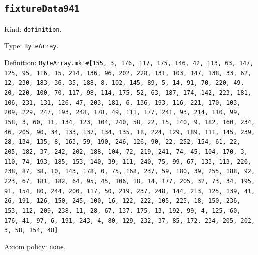 \documentclass[11pt]{article}
\begin{document}
\subsection*{\texttt{fixtureData941}}
\noindent Kind: \texttt{definition}.\par
\noindent Type: \texttt{ByteArray}.\par
\noindent Definition: \texttt{ByteArray.mk \#[155, 3, 176, 117, 175, 146, 42, 113, 63, 147, 125, 95, 116, 15, 214, 136, 96, 202, 228, 131, 103, 147, 138, 33, 62, 12, 230, 183, 36, 35, 188, 8, 102, 145, 89, 5, 14, 91, 70, 220, 49, 20, 220, 100, 70, 117, 98, 114, 175, 52, 63, 187, 174, 142, 223, 181, 106, 231, 131, 126, 47, 203, 181, 6, 136, 193, 116, 221, 170, 103, 209, 229, 247, 193, 248, 178, 49, 111, 177, 241, 93, 214, 110, 99, 158, 3, 60, 11, 134, 123, 104, 240, 58, 22, 15, 140, 9, 182, 160, 234, 46, 205, 90, 34, 133, 137, 134, 135, 18, 224, 129, 189, 111, 145, 239, 28, 134, 135, 8, 163, 59, 190, 246, 126, 90, 22, 252, 154, 61, 22, 205, 182, 37, 242, 202, 188, 104, 72, 219, 241, 74, 45, 104, 170, 3, 110, 74, 193, 185, 153, 140, 39, 111, 240, 75, 99, 67, 133, 113, 220, 238, 87, 38, 10, 143, 178, 0, 75, 168, 237, 59, 180, 39, 255, 188, 92, 223, 67, 181, 182, 64, 95, 45, 106, 18, 14, 177, 205, 32, 73, 34, 195, 91, 154, 80, 244, 200, 117, 50, 219, 237, 248, 144, 213, 125, 139, 41, 26, 191, 126, 150, 245, 100, 16, 122, 222, 105, 225, 18, 150, 236, 153, 112, 209, 238, 11, 28, 67, 137, 175, 13, 192, 99, 4, 125, 60, 176, 41, 97, 6, 191, 243, 4, 80, 129, 232, 37, 85, 172, 234, 205, 202, 3, 58, 154, 48]}.\par
\noindent Axiom policy: \texttt{none}.\par
\end{document}
